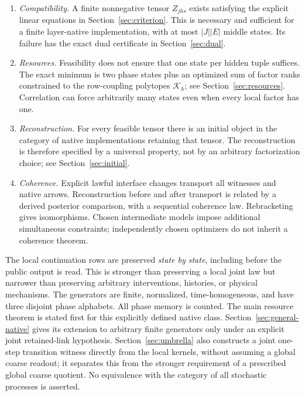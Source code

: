 \documentclass[11pt]{article}
\newcommand{\Kcal}{\mathcal K}
\theoremstyle{remark}
\begin{document}
\begin{enumerate}
\item \emph{Compatibility.} A finite nonnegative tensor $Z_{jhs}$ exists satisfying the explicit linear equations in Section~\ref{sec:criterion}. This is necessary and sufficient for a finite layer-native implementation, with at most $|J||E|$ middle states. Its failure has the exact dual certificate in Section~\ref{sec:dual}.
\item \emph{Resources.} Feasibility does not ensure that one state per hidden tuple suffices. The exact minimum is two phase states plus an optimized sum of factor ranks constrained to the row-coupling polytopes $\Kcal_h$; see Section~\ref{sec:resources}. Correlation can force arbitrarily many states even when every local factor has one.
\item \emph{Reconstruction.} For every feasible tensor there is an initial object in the category of native implementations retaining that tensor. The reconstruction is therefore specified by a universal property, not by an arbitrary factorization choice; see Section~\ref{sec:initial}.
\item \emph{Coherence.} Explicit lawful interface changes transport all witnesses and native arrows. Reconstruction before and after transport is related by a derived posterior comparison, with a sequential coherence law. Rebracketing gives isomorphisms. Chosen intermediate models impose additional simultaneous constraints; independently chosen optimizers do not inherit a coherence theorem.
\end{enumerate}

The local continuation rows are preserved \emph{state by state}, including before the public output is read. This is stronger than preserving a local joint law but narrower than preserving arbitrary interventions, histories, or physical mechanisms. The generators are finite, normalized, time-homogeneous, and have three disjoint phase alphabets. All phase memory is counted. The main resource theorem is stated first for this explicitly defined native class. Section~\ref{sec:general-native} gives its extension to arbitrary finite generators only under an explicit joint retained-link hypothesis. Section~\ref{sec:umbrella} also constructs a joint one-step transition witness directly from the local kernels, without assuming a global coarse readout; it separates this from the stronger requirement of a prescribed global coarse quotient. No equivalence with the category of all stochastic processes is asserted.
\end{document}
